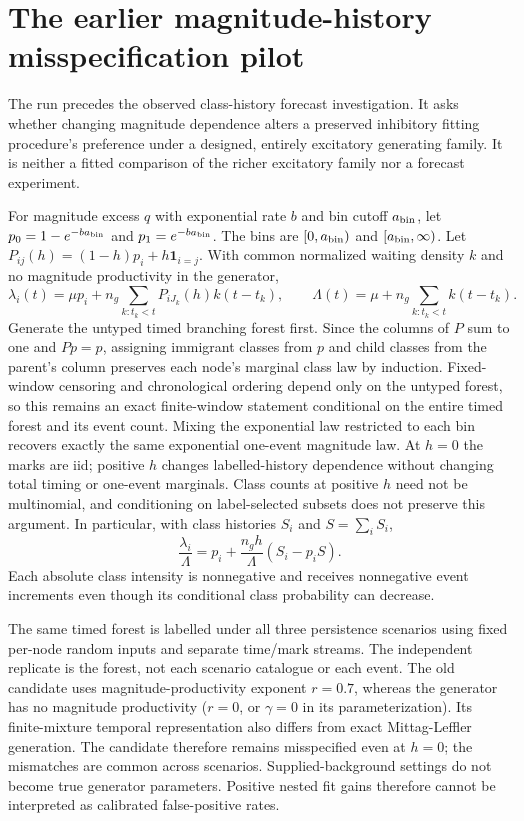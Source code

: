 \section{The earlier magnitude-history misspecification pilot}
\label{sec:magnitude-history-pilot}
The run  precedes the observed
class-history forecast investigation. It asks whether changing magnitude
dependence alters a preserved inhibitory fitting procedure's preference under
a designed, entirely excitatory generating family. It is neither a fitted
comparison of the richer excitatory family nor a forecast experiment.

For magnitude excess $q$ with exponential rate $b$ and bin cutoff $a_{\rm bin}$, let $p_0=1-e^{-b a_{\rm bin}}$ and $p_1=e^{-b a_{\rm bin}}$. The bins are $[0,a_{\rm bin})$ and $[a_{\rm bin},\infty)$. Let
$P_{ij}(h)=(1-h)p_i+h\mathbf1_{i=j}$. With common normalized waiting density
$k$ and no magnitude productivity in the generator,
\[
 \lambda_i(t)=\mu p_i+n_g\sum_{k:t_k<t}P_{iJ_k}(h)k(t-t_k),\qquad
 \Lambda(t)=\mu+n_g\sum_{k:t_k<t}k(t-t_k).
\]
Generate the untyped timed branching forest first. Since the columns of $P$
sum to one and $Pp=p$, assigning immigrant classes from $p$ and child classes
from the parent's column preserves each node's marginal class law by induction.
Fixed-window censoring and chronological ordering depend only on the untyped
forest, so this remains an exact finite-window statement conditional on the
entire timed forest and its event count. Mixing the exponential law restricted
to each bin recovers exactly the same exponential one-event magnitude law.
At $h=0$ the marks are iid; positive $h$ changes labelled-history dependence
without changing total timing or one-event marginals. Class counts at positive
$h$ need not be multinomial, and conditioning on label-selected subsets does
not preserve this argument. In particular, with class histories $S_i$ and
$S=\sum_iS_i$,
\[
 \frac{\lambda_i}{\Lambda}
 =p_i+\frac{n_gh}{\Lambda}(S_i-p_iS).
\]
Each absolute class intensity is nonnegative and receives nonnegative event
increments even though its conditional class probability can decrease.

The same timed forest is labelled under all three persistence scenarios using
fixed per-node random inputs and separate time/mark streams. The independent
replicate is the forest, not each scenario catalogue or each event. The old
candidate uses magnitude-productivity exponent $r=0.7$, whereas the generator has no magnitude productivity ($r=0$, or $\gamma=0$ in its parameterization). Its finite-mixture temporal representation also differs from exact Mittag-Leffler generation. The candidate therefore remains misspecified even
at $h=0$; the mismatches are common across scenarios. Supplied-background
settings do not become true generator parameters. Positive nested fit gains
therefore cannot be interpreted as calibrated false-positive rates.

